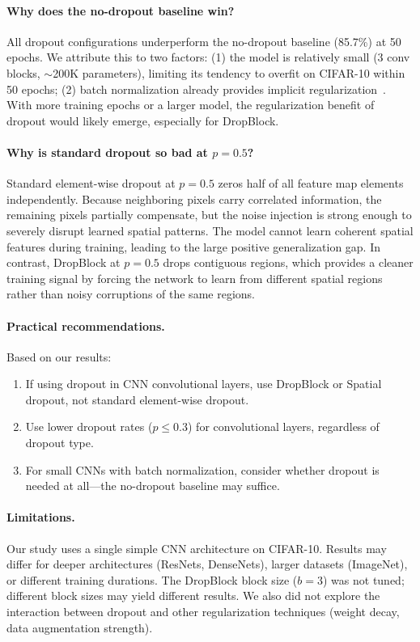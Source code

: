 \documentclass[11pt]{article}
\begin{document}
\paragraph{Why does the no-dropout baseline win?}
All dropout configurations underperform the no-dropout baseline (85.7\%) at 50 epochs. We attribute this to two factors: (1) the model is relatively small (3 conv blocks, $\sim$200K parameters), limiting its tendency to overfit on CIFAR-10 within 50 epochs; (2) batch normalization already provides implicit regularization~\citep{krizhevsky2012}. With more training epochs or a larger model, the regularization benefit of dropout would likely emerge, especially for DropBlock.

\paragraph{Why is standard dropout so bad at $p{=}0.5$?}
Standard element-wise dropout at $p{=}0.5$ zeros half of all feature map elements independently. Because neighboring pixels carry correlated information, the remaining pixels partially compensate, but the noise injection is strong enough to severely disrupt learned spatial patterns. The model cannot learn coherent spatial features during training, leading to the large positive generalization gap. In contrast, DropBlock at $p{=}0.5$ drops contiguous regions, which provides a cleaner training signal by forcing the network to learn from different spatial regions rather than noisy corruptions of the same regions.

\paragraph{Practical recommendations.}
Based on our results:
\begin{enumerate}
    \item If using dropout in CNN convolutional layers, use DropBlock or Spatial dropout, not standard element-wise dropout.
    \item Use lower dropout rates ($p \leq 0.3$) for convolutional layers, regardless of dropout type.
    \item For small CNNs with batch normalization, consider whether dropout is needed at all---the no-dropout baseline may suffice.
\end{enumerate}

\paragraph{Limitations.}
Our study uses a single simple CNN architecture on CIFAR-10. Results may differ for deeper architectures (ResNets, DenseNets), larger datasets (ImageNet), or different training durations. The DropBlock block size ($b{=}3$) was not tuned; different block sizes may yield different results. We also did not explore the interaction between dropout and other regularization techniques (weight decay, data augmentation strength).
\end{document}
